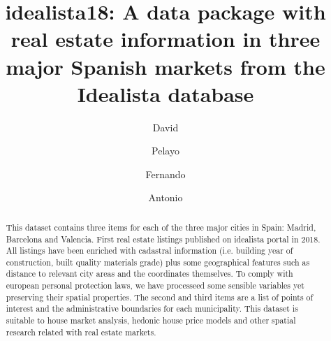 \documentclass[times,final]{elsarticle}
\begin{document}

\begin{frontmatter}

\title{idealista18: A data package with real estate information in three major Spanish markets from the Idealista database}%

\author[1]{David }
\author[1]{Pelayo }
\author[2]{Fernando }
\author[3]{Antonio }

\address[1]{idealista, Plaza de las Cortes 5, 28014 Madrid, Spain}
\address[2]{Facultad de CC de la Empresa, C/ Real, 3. 30201 Cartagena, Murcia (Spain)}
\address[3]{School of Earth, Environment and Society, McMaster University, 1280 Main St W, Hamilton, Ontario L8S 4K1 Canada}



\begin{abstract}
This dataset contains three items for each of the three major cities in Spain: Madrid, Barcelona and Valencia. First real estate listings published on idealista portal in 2018. All listings have been enriched with cadastral information (i.e. building year of construction, built quality materials grade) plus some geographical features such as
distance to relevant city areas and the coordinates themselves. To comply with european personal protection laws, we have processeed some sensible variables yet preserving their spatial properties. The second and third items are a list of points of interest and the administrative boundaries for each municipality.
This dataset is suitable to house market analysis, hedonic house price models and other spatial research related with real estate markets.


\end{abstract}
\end{frontmatter}
\end{document}
